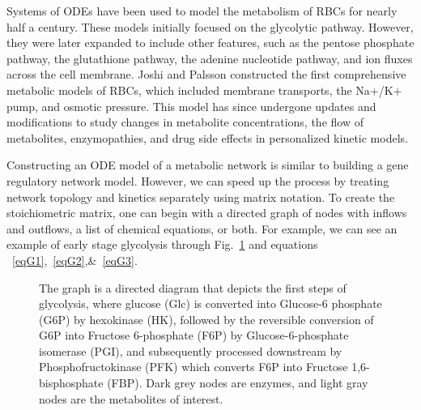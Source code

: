 \documentclass[conference]{IEEEtran}
\begin{document}
Systems of ODEs have been used to model the metabolism of RBCs for nearly half a century. These models initially focused on the glycolytic pathway\cite{b17, b18}. However, they were later expanded to include other features, such as the pentose phosphate pathway, the glutathione pathway, the adenine nucleotide pathway, and ion fluxes across the cell membrane\cite{b19, b20, b21, b22}. Joshi and Palsson constructed the first comprehensive metabolic models of RBCs, which included membrane transports, the Na+/K+ pump, and osmotic pressure\cite{b23, b24, b25, b26}. This model has since undergone updates and modifications to study changes in metabolite concentrations, the flow of metabolites, enzymopathies, and drug side effects in personalized kinetic models\cite{b12, b27, b28, b29, b30, b31}.

Constructing an ODE model of a metabolic network is similar to building a gene regulatory network model. However, we can speed up the process by treating network topology and kinetics separately using matrix notation. To create the stoichiometric matrix, one can begin with a directed graph of nodes with inflows and outflows, a list of chemical equations, or both. For example, we can see an example of early stage glycolysis through Fig.~\ref{fig2} and equations ~\ref{eqG1},~\ref{eqG2},\&~\ref{eqG3}.
\begin{figure}[htbp]
  \centering
  \caption{The graph is a directed diagram that depicts the first steps of glycolysis, where glucose (Glc) is converted into Glucose-6 phosphate (G6P) by hexokinase (HK), followed by the reversible conversion of G6P into Fructose 6-phosphate (F6P) by Glucose-6-phosphate isomerase (PGI), and subsequently processed downstream by Phosphofructokinase (PFK) which converts F6P into Fructose 1,6-bisphosphate (FBP). Dark grey nodes are enzymes, and light gray nodes are the metabolites of interest.}
  \label{fig2}
\end{figure}
\end{document}
